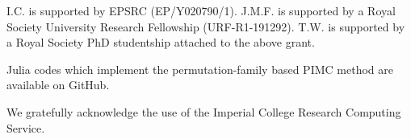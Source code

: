 \documentclass[aps,physrev,reprint,superscriptaddress,nofootinbib,amsmath,amssymb,a4paper]{revtex4-2}
\begin{document}
\begin{acknowledgements}

 I.C. is supported by EPSRC (EP/Y020790/1). %
J.M.F.
is supported by a Royal Society University Research Fellowship
(URF-R1-191292).
T.W. is supported by a Royal Society PhD studentship attached to the above grant. 

Julia codes which implement the permutation-family based PIMC method are available on GitHub\cite{Halcyon.jl}.

We gratefully acknowledge the use of the Imperial College Research Computing Service\cite{HPC}.
\end{acknowledgements}


\end{document}
